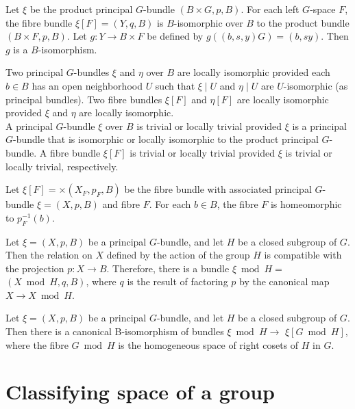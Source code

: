 Let $\xi$ be the product principal $G$-bundle $(B \times G, p, B)$. For each left $G$-space $F$, the fibre bundle $\xi[F]=(Y, q, B)$ is $B$-isomorphic over $B$ to the product bundle $(B \times F, p, B)$. Let $g: Y \rightarrow B \times F$ be defined by $g((b, s, y) G)=(b, s y)$. Then $g$ is a $B$-isomorphism.

Two principal $G$-bundles $\xi$ and $\eta$ over $B$ are locally isomorphic provided each $b \in B$ has an open neighborhood $U$ such that $\xi \mid U$ and $\eta \mid U$ are $U$-isomorphic (as principal bundles). Two fibre bundles $\xi[F]$ and $\eta[F]$ are locally isomorphic provided $\xi$ and $\eta$ are locally isomorphic.\\
A principal $G$-bundle $\xi$ over $B$ is trivial or locally trivial provided $\xi$ is a principal $G$-bundle that is isomorphic or locally isomorphic to the product principal $G$-bundle. A fibre bundle $\xi[F]$ is trivial or locally trivial provided $\xi$ is trivial or locally trivial, respectively.

\begin{prop}

Let $\xi[F]=\times\left(X_F, p_F, B\right)$ be the fibre bundle with associated principal $G$-bundle $\xi=(X, p, B)$ and fibre $F$. For each $b \in B$, the fibre $F$ is homeomorphic to $p_F^{-1}(b)$.

\end{prop}


Let $\xi=(X, p, B)$ be a principal $G$-bundle, and let $H$ be a closed subgroup of $G$. Then the relation on $X$ defined by the action of the group $H$ is compatible with the projection $p: X \rightarrow B$. Therefore, there is a bundle $\xi \bmod H=$ $(X \bmod H, q, B)$, where $q$ is the result of factoring $p$ by the canonical map $X \rightarrow X \bmod H$.

\begin{theo}
    Let $\xi=(X, p, B)$ be a principal $G$-bundle, and let $H$ be a closed subgroup of $G$. Then there is a canonical B-isomorphism of bundles $\xi \bmod H \rightarrow$ $\xi[G \bmod H]$, where the fibre $G \bmod H$ is the homogeneous space of right cosets of $H$ in $G$.
\end{theo}



\section{Classifying space of a group}

